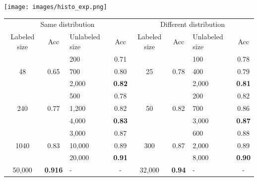 {\begin{minipage}[c]{\textwidth}
{\begin{itemize}
    \end{itemize}
    }
    \vspace{0.3em}
    \begin{minipage}[c]{\textwidth}
     \centering
     \texttt{[image: images/histo\_exp.png]}
   \end{minipage}
    
    \begin{center}{\fontsize{\txtfontsize}{8} \selectfont \setlength{\tabcolsep}{4pt} \renewcommand{\arraystretch}{0.55}
  \begin{tabular}{cclccclc}
    \toprule
    \multicolumn{4}{c}{Same distribution} & \multicolumn{4}{c}{Different distribution} \\
    \cmidrule(lr){1-4} \cmidrule(lr){5-8}
    Labeled size & Acc & Unlabeled size & Acc & Labeled size & Acc & Unlabeled size & Acc \\
    \midrule 
            &      & 200    & 0.71   &     &      & 100   & 0.78  \\
      48    & 0.65 & 700    & 0.80   & 25  & 0.78 & 400   & 0.79  \\
            &      & 2,000  & \textbf{0.82} & &   & 2,000 & \textbf{0.81} \\    
    \midrule
            &      & 500    & 0.78   &     &      & 200   & 0.82  \\
     240    & 0.77 & 1,200  & 0.82   & 50  & 0.82 & 700   & 0.86  \\
            &      & 4,000  & \textbf{0.83} & &   & 3,000 & \textbf{0.87}  \\
    \midrule 
            &      & 3,000   & 0.87  &     &      & 600   & 0.88  \\
    1040    & 0.83 & 10,000  & 0.89  & 300 & 0.87 & 2,000 & 0.89  \\
            &      & 20,000  & \textbf{0.91} & &  & 8,000 & \textbf{0.90}  \\
    \midrule
     50,000 & \textbf{0.916}  & - & - & 32,000 & \textbf{0.94} & - & - \\  
    \bottomrule
  \end{tabular}
    }
  \end{center}
    

\end{minipage}}
